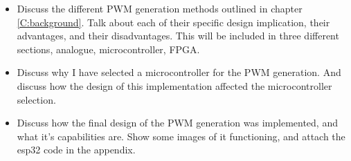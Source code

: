\begin{itemize}

    \item 
    Discuss the different PWM generation methods outlined in chapter \ref{C:background}. Talk about each of their specific design implication, their advantages, and their disadvantages. This will be included in three different sections, analogue, microcontroller, FPGA. 

    \item 
    Discuss why I have selected a microcontroller for the PWM generation. And discuss how the design of this implementation affected the microcontroller selection. 

    \item 
    Discuss how the final design of the PWM generation was implemented, and what it's capabilities are. Show some images of it functioning, and attach the esp32 code in the appendix.

\end{itemize}